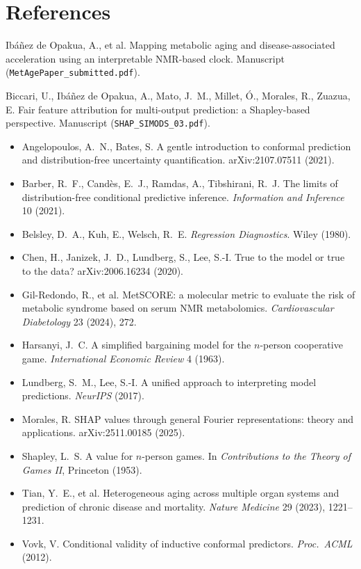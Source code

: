 \documentclass[11pt,a4paper]{article}
\theoremstyle{plain}
\theoremstyle{definition}
\theoremstyle{remark}
\begin{document}
\section*{References}
\begin{small}
\begin{description}[leftmargin=2.6em,style=nextline,itemsep=2pt]
\item[\PI] Ib\'a\~nez de Opakua, A., et al. Mapping metabolic aging and disease-associated acceleration using an interpretable NMR-based clock. Manuscript (\texttt{MetAgePaper\_submitted.pdf}).
\item[\PII] Biccari, U., Ib\'a\~nez de Opakua, A., Mato, J.~M., Millet, \'O., Morales, R., Zuazua, E. Fair feature attribution for multi-output prediction: a Shapley-based perspective. Manuscript (\texttt{SHAP\_SIMODS\_03.pdf}).
\end{description}
\begin{itemize}[leftmargin=1.2em,itemsep=2pt]
\item Angelopoulos, A.~N., Bates, S. A gentle introduction to conformal prediction and distribution-free uncertainty quantification. arXiv:2107.07511 (2021).
\item Barber, R.~F., Cand\`es, E.~J., Ramdas, A., Tibshirani, R.~J. The limits of distribution-free conditional predictive inference. \emph{Information and Inference} 10 (2021).
\item Belsley, D.~A., Kuh, E., Welsch, R.~E. \emph{Regression Diagnostics}. Wiley (1980).
\item Chen, H., Janizek, J.~D., Lundberg, S., Lee, S.-I. True to the model or true to the data? arXiv:2006.16234 (2020).
\item Gil-Redondo, R., et al. MetSCORE: a molecular metric to evaluate the risk of metabolic syndrome based on serum NMR metabolomics. \emph{Cardiovascular Diabetology} 23 (2024), 272.
\item Harsanyi, J.~C. A simplified bargaining model for the $n$-person cooperative game. \emph{International Economic Review} 4 (1963).
\item Lundberg, S.~M., Lee, S.-I. A unified approach to interpreting model predictions. \emph{NeurIPS} (2017).
\item Morales, R. SHAP values through general Fourier representations: theory and applications. arXiv:2511.00185 (2025).
\item Shapley, L.~S. A value for $n$-person games. In \emph{Contributions to the Theory of Games II}, Princeton (1953).
\item Tian, Y.~E., et al. Heterogeneous aging across multiple organ systems and prediction of chronic disease and mortality. \emph{Nature Medicine} 29 (2023), 1221--1231.
\item Vovk, V. Conditional validity of inductive conformal predictors. \emph{Proc.\ ACML} (2012).
\end{itemize}
\end{small}
\end{document}
